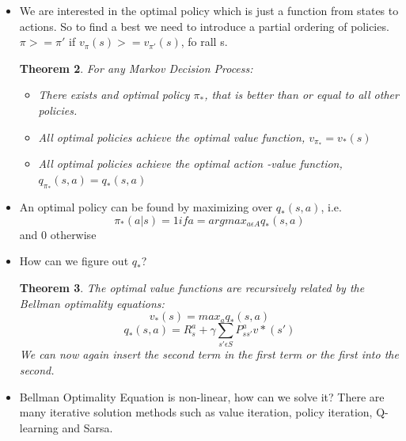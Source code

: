 \documentclass[a4paper]{article}
\newtheorem{theorem}{Theorem}
\begin{document}
\begin{itemize}
    \begin{theorem}
    The optimal state-value function $v_{*}$ is the maximum value funciton over all policies: 
    $$ v_{*}(s) = max_{\pi}v_{\pi}(s)$$
    The optimal action-value function $$q_{*}(s,a) = max_{\pi} q_{\pi}(s,a)$$ 
    The optimal value function specifies the best possible performance in the MDP. And MDP is "solved" when we know the optimal value function. 
    \newline
    If you think of it, you are trying to find the policy which maximizes the rewards you get in this system and thus maximizes the expected return starting from state s and following policy $\pi$(state value function). Or in other words, under every possible policy, we will get a specific state value function which is maximal. 
    \newline
    Also if you have the optimal action-value function you are basically done, because you can insert any action possible and then choose the one with the larges action value function. 
     \end{theorem}
    \item We are interested in the optimal policy which is just a function from states to actions. So to find a best we need to introduce a partial ordering of policies. $\pi >= \pi'$ if $v_{\pi}(s) >= v_{\pi'}(s)$, fo rall s. 
    \begin{theorem}
    For any Markov Decision Process: 
    \begin{itemize}
        \item There exists and optimal policy $\pi_{*}$, that is better than or equal to all other policies. 
        \item All optimal policies achieve the optimal value function, $v_{\pi_{*}} = v_*(s)$
        \item All optimal policies achieve the optimal action -value function, $q_{\pi_{*}}(s,a) = q_*(s,a)$
    \end{itemize}
    \end{theorem}
    \item An optimal policy can be found by maximizing over $q_*(s,a)$, i.e. 
    $$\pi_*(a|s) = 1 if a = argmax_{a\epsilon A}q_*(s,a)$$ and 0 otherwise
    \item How can we figure out $q_*$? 
    \begin{theorem}
    The optimal value functions are recursively related by the Bellman optimality equations: 
    $$v_*(s) = max_a q_*(s,a)$$
    $$q_*(s,a) = R_s^a + \gamma \sum_{s'\epsilon S}P_{ss'}^a v*(s')$$
    We can now again insert the second term in the first term or the first into the second. 
    \end{theorem}
    \item Bellman Optimality Equation is non-linear, how can we solve it? There are many iterative solution methods such as value iteration, policy iteration, Q-learning and Sarsa. 
\end{itemize} 
\end{document}
